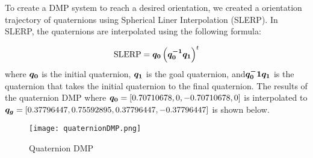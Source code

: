 To create a DMP system to reach a desired orientation, we created a orientation trajectory of quaternions using Spherical Liner Interpolation
(SLERP). In SLERP, the quaternions are interpolated using the following formula:

\begin{equation}
    \text{SLERP} = \boldsymbol{q_0} \left( \boldsymbol{q_0^{-1} q_1} \right)^t
\end{equation}
where $\boldsymbol{q_0}$ is the initial quaternion, $\boldsymbol{q_1}$ is the goal quaternion, and$\boldsymbol{q_0^-1 q_1}$ is 
the quaternion that takes the initial quaternion to the final quaternion. The results of the quaternion DMP where 
$\boldsymbol{q_0} =[0.70710678,0,-0.70710678,0] $  is interpolated to 
$\boldsymbol{q_g} = [0.37796447 , 0.75592895  ,0.37796447, -0.37796447]$ is shown below.

\begin{figure}[h]
\centering
\texttt{[image: quaternionDMP.png]}
\caption{Quaternion DMP}
\label{fig:quaternionDMP}
\end{figure}




